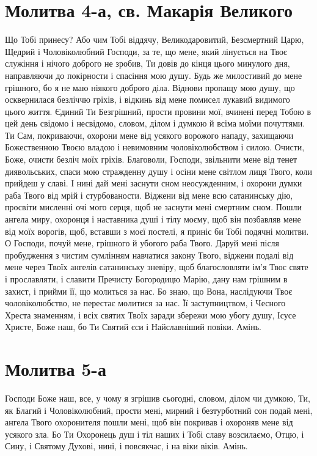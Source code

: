 \documentclass[chapters.tex]{subfiles}
\begin{document}
\section{Молитва 4-а, св. Макарія Великого}
Що Тобі принесу? Або чим Тобі віддячу, Великодаровитий, Безсмертний Царю, Щедрий і Чоловіколюбний Господи, за те, що мене, який лінується на Твоє служіння і нічого доброго не зробив, Ти довів до кінця цього минулого дня, направляючи до покірности і спасіння мою душу. Будь же милостивий до мене грішного, бо я не маю ніякого доброго діла. Віднови пропащу мою душу, що осквернилася безліччю гріхів, і відкинь від мене помисел лукавий видимого цього життя. Єдиний Ти Безгрішний, прости провини мої, вчинені перед Тобою в цей день свідомо і несвідомо, словом, ділом і думкою й всіма моїми почуттями. Ти Сам, покриваючи, охорони мене від усякого ворожого нападу, захищаючи Божественною Твоєю владою і невимовним чоловіколюбством і силою. Очисти, Боже, очисти безліч моїх гріхів. Благоволи, Господи, звільнити мене від тенет диявольських, спаси мою стражденну душу і осіни мене світлом лиця Твого, коли прийдеш у славі. І нині дай мені заснути сном неосужденним, і охорони думки раба Твого від мрій і стурбованости. Віджени від мене всю сатанинську дію, просвіти мисленні очі мого серця, щоб не заснути мені смертним сном. Пошли ангела миру, охоронця і наставника душі і тілу моєму, щоб він позбавляв мене від моїх ворогів, щоб, вставши з моєї постелі, я приніс би Тобі подячні молитви. О Господи, почуй мене, грішного й убогого раба Твого. Даруй мені після пробудження з чистим сумлінням навчатися закону Твого, віджени подалі від мене через Твоїх ангелів сатанинську зневіру, щоб благословляти ім’я Твоє святе і прославляти, і славити Пречисту Богородицю Марію, дану нам грішним в захист, і прийми її, що молиться за нас. Бо знаю, що Вона, наслідуючи Твоє чоловіколюбство, не перестає молитися за нас. Її заступництвом, і Чесного Хреста знаменням, і всіх святих Твоїх заради збережи мою убогу душу, Ісусе Христе, Боже наш, бо Ти Святий єси і Найславніший повіки. Амінь.

\section{Молитва 5-а}
Господи Боже наш, все, у чому я згрішив сьогодні, словом, ділом чи думкою, Ти, як Благий і Чоловіколюбний, прости мені, мирний і безтурботний сон подай мені, ангела Твого охоронителя пошли мені, щоб він покривав і охороняв мене від усякого зла. Бо Ти Охоронець душ і тіл наших і Тобі славу возсилаємо, Отцю, і Сину, і Святому Духові, нині, і повсякчас, і на віки віків. Амінь.
\end{document}
